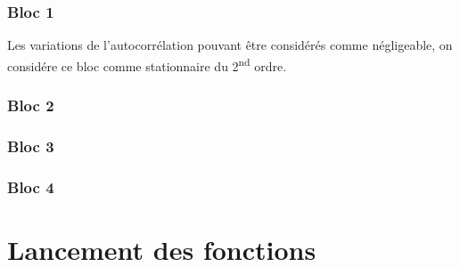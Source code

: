 \documentclass[french, a4paper, 12pt, openany]{book}
\begin{document}
  \subsection{Bloc 1}
  Les variations de l'autocorrélation pouvant être considérés comme négligeable, on considére ce bloc comme stationnaire du 2\textsuperscript{nd} ordre.
  \subsection{Bloc 2}
  \subsection{Bloc 3}
  \subsection{Bloc 4}

\chapter{Lancement des fonctions}
\end{document}
